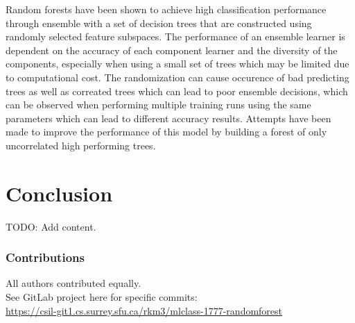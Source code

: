 \documentclass{article} %
\begin{document}
Random forests have been shown to achieve high classification performance through ensemble with a set of decision trees that are constructed using randomly selected feature subspaces. The performance of an ensemble learner is dependent on the accuracy of each component learner and the diversity of the components, especially when using a small set of trees which may be limited due to computational cost. The randomization can cause occurence of bad predicting trees as well as correated trees which can lead to poor ensemble decisions, which can be observed when performing multiple training runs using the same parameters which can lead to different accuracy results. Attempts have been made to improve the performance of this model by building a forest of only uncorrelated high performing trees. \cite{Bharathidason2014}

\section{Conclusion}
TODO: Add content.


\subsubsection*{Contributions}
All authors contributed equally.\\
See GitLab project here for specific commits:\\
\href{
    https://csil-git1.cs.surrey.sfu.ca/rkm3/mlclass-1777-randomforest
}{
    https://csil-git1.cs.surrey.sfu.ca/rkm3/mlclass-1777-randomforest
}


\small{


}
\end{document}
